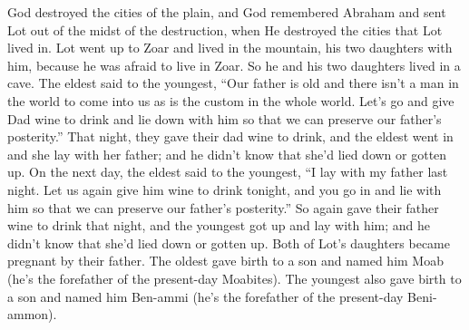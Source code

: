 \begin{inparaenum}
   God destroyed the cities of the plain, and God remembered Abraham and sent Lot out of the midst of the destruction, when He destroyed the cities that Lot lived in.%
   Lot went up to Zoar and lived in the mountain, his two daughters with him, because he was afraid to live in Zoar. So he and his two daughters lived in a cave.%
   The eldest said to the youngest, ``Our father is old and there isn't a man in the world to come into us as is the custom in the whole world.%
   Let's go and give Dad wine to drink and lie down with him so that we can preserve our father's posterity.''%
   That night, they gave their dad wine to drink, and the eldest went in and she lay with her father; and he didn't know that she'd lied down or gotten up.%
   On the next day, the eldest said to the youngest, ``I lay with my father last night. Let us again give him wine to drink tonight, and you go in and lie with him so that we can preserve our father's posterity.''%
   So again gave their father wine to drink that night, and the youngest got up and lay with him; and he didn't know that she'd lied down or gotten up.%
   Both of Lot's daughters became pregnant by their father.%
   The oldest gave birth to a son and named him Moab (he's the forefather of the present-day Moabites).%
   The youngest also gave birth to a son and named him Ben-ammi (he's the forefather of the present-day Beni-ammon).%
\end{inparaenum}
